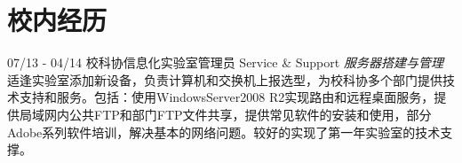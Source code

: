 \documentclass[]{friggeri-cv}
\begin{document}
\newpage


\section{校内经历}
\begin{entrylist}
  \entry
    {07/13 - 04/14}
    {校科协信息化实验室管理员}
    {Service \& Support}
    {\emph{服务器搭建与管理}
    适逢实验室添加新设备，负责计算机和交换机上报选型，为校科协多个部门提供技术支持和服务。包括：使用WindowsServer2008 R2实现路由和远程桌面服务，提供局域网内公共FTP和部门FTP文件共享，提供常见软件的安装和使用，部分Adobe系列软件培训，解决基本的网络问题。较好的实现了第一年实验室的技术支撑。  \\     
    }
    
\end{entrylist}


\end{document}
